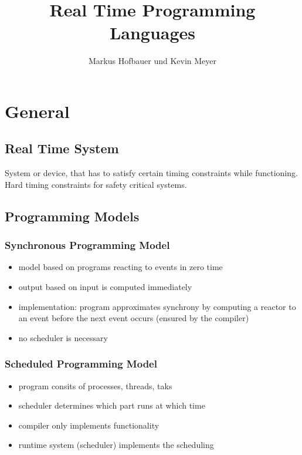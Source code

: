 \documentclass[german]{latex4ei/latex4ei_sheet}
\title{Real Time Programming Languages}
\author{Markus Hofbauer und Kevin Meyer}
\begin{document}
\ifdefined\GitRevision{}\fi

\maketitle

\section{General}
\begin{sectionbox}
\subsection{Real Time System}
System or device, that has to satisfy certain timing constraints while functioning.\\
Hard timing constraints for safety critical systems.

\subsection{Programming Models}
\subsubsection{Synchronous Programming Model}
\begin{itemize}
\item model based on programs reacting to events in zero time
\item output based on input is computed immediately
\item implementation: program approximates synchrony by computing a reactor to an event before the next event occurs (ensured by the compiler)
\item no scheduler is necessary
\end{itemize}

\subsubsection{Scheduled Programming Model}
\begin{itemize}
\item program consits of processes, threads, taks
\item scheduler determines which part runs at which time
\item compiler only implements functionality
\item runtime system (scheduler) implements the scheduling
\end{itemize}


\end{sectionbox}
\end{document}
